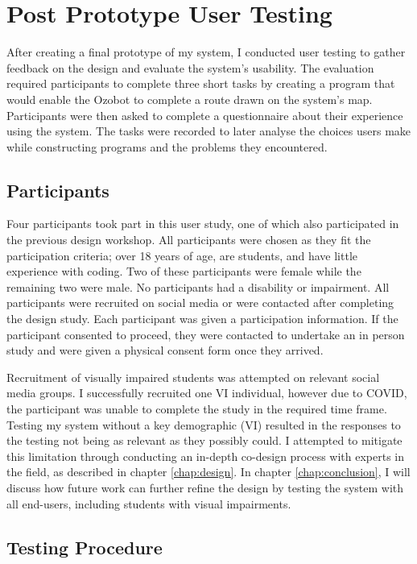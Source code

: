 \documentclass[oneside,%
                    author={Malak Hajji},
                    degree={BSc},
                    title={Designing An Accessible Computational Toolkit For Students},
                  subtitle={With Mixed Visual Abilities}]{dissertation}
\begin{document}
\chapter{Post Prototype User Testing}
\label{chap:testing}

After creating a final prototype of my system, I conducted user testing to gather feedback on the design and evaluate the system's usability. The evaluation required participants to complete three short tasks by creating a program that would enable the Ozobot to complete a route drawn on the system's map. Participants were then asked to complete a questionnaire about their experience using the system. The tasks were recorded to later analyse the choices users make while constructing programs and the problems they encountered.

\section{Participants}
Four participants took part in this user study, one of which also participated in the previous design workshop. All participants were chosen as they fit the participation criteria; over 18 years of age, are students, and have little experience with coding. Two of these participants were female while the remaining two were male. No participants had a disability or impairment. All participants were recruited on social media or were contacted after completing the design study. Each participant was given a participation information. If the participant consented to proceed, they were contacted to undertake an in person study and were given a physical consent form once they arrived. 

Recruitment of visually impaired students was attempted on relevant social media groups. I successfully recruited one VI individual, however due to COVID, the participant was unable to complete the study in the required time frame. Testing my system without a key demographic (VI) resulted in the responses to the testing not being as relevant as they possibly could. I attempted to mitigate this limitation through conducting an in-depth co-design process with experts in the field, as described in chapter \ref{chap:design}. In chapter \ref{chap:conclusion}, I will discuss how future work can further refine the design by testing the system with all end-users, including students with visual impairments. 

\section{Testing Procedure}
\end{document}
